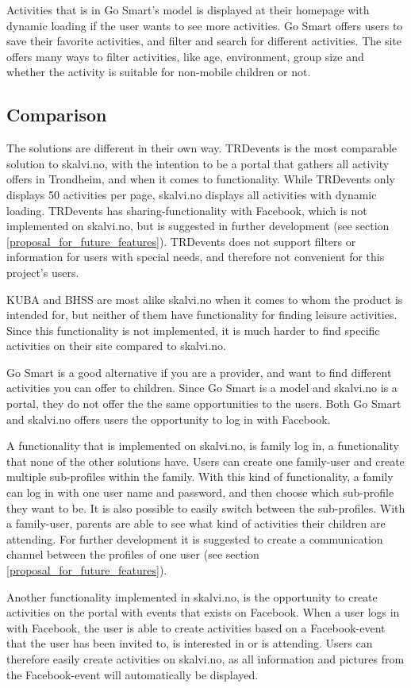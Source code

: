 Activities that is in Go Smart's model is displayed at their homepage with dynamic loading if the user wants to see more activities. Go Smart offers users to save their favorite activities, and filter and search for different activities. The site offers many ways to filter activities, like age, environment, group size and whether the activity is suitable for non-mobile children or not.

\subsection{Comparison}
The solutions are different in their own way. TRDevents is the most comparable solution to skalvi.no, with the intention to be a portal that gathers all activity offers in Trondheim, and when it comes to functionality. While TRDevents only displays 50 activities per page, skalvi.no displays all activities with dynamic loading. TRDevents has sharing-functionality with Facebook, which is not implemented on skalvi.no, but is suggested in further development (see section \ref{proposal_for_future_features}). TRDevents does not support filters or information for users with special needs, and therefore not convenient for this project's users. 

KUBA and BHSS are most alike skalvi.no when it comes to whom the product is intended for, but neither of them have functionality for finding leisure activities. Since this functionality is not implemented, it is much harder to find specific activities on their site compared to skalvi.no.

Go Smart is a good alternative if you are a provider, and want to find different activities you can offer to children. Since Go Smart is a model and skalvi.no is a portal, they do not offer the the same opportunities to the users. Both Go Smart and skalvi.no offers users the opportunity to log in with Facebook.

A functionality that is implemented on skalvi.no, is family log in, a functionality that none of the other solutions have. Users can create one family-user and create multiple sub-profiles within the family. With this kind of functionality, a family can log in with one user name and password, and then choose which sub-profile they want to be. It is also possible to easily switch between the sub-profiles. With a family-user, parents are able to see what kind of activities their children are attending. For further development it is suggested to create a communication channel between the profiles of one user (see section \ref{proposal_for_future_features}).

Another functionality implemented in skalvi.no, is the opportunity to create activities on the portal with events that exists on Facebook. When a user logs in with Facebook, the user is able to create activities based on a Facebook-event that the user has been invited to, is interested in or is attending. Users can therefore easily create activities on skalvi.no, as all information and pictures from the Facebook-event will automatically be displayed.



\cleardoublepage